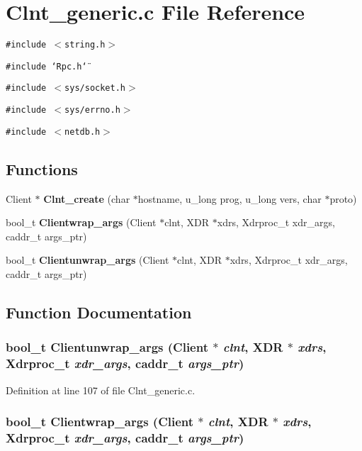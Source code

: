 \section{Clnt\_\-generic.c File Reference}
\label{Clnt__generic_8c}
{\tt \#include $<$string.h$>$}\par
{\tt \#include \char`\"{}Rpc.h\char`\"{}}\par
{\tt \#include $<$sys/socket.h$>$}\par
{\tt \#include $<$sys/errno.h$>$}\par
{\tt \#include $<$netdb.h$>$}\par
\subsection*{Functions}
\begin{CompactItemize}
\item 
Client $\ast$ {\bf Clnt\_\-create} (char $\ast$hostname, u\_\-long prog, u\_\-long vers, char $\ast$proto)
\item 
bool\_\-t {\bf Clientwrap\_\-args} (Client $\ast$clnt, XDR $\ast$xdrs, Xdrproc\_\-t xdr\_\-args, caddr\_\-t args\_\-ptr)
\item 
bool\_\-t {\bf Clientunwrap\_\-args} (Client $\ast$clnt, XDR $\ast$xdrs, Xdrproc\_\-t xdr\_\-args, caddr\_\-t args\_\-ptr)
\end{CompactItemize}


\subsection{Function Documentation}
\subsubsection{\setlength{\rightskip}{0pt plus 5cm}bool\_\-t Clientunwrap\_\-args (Client $\ast$ {\em clnt}, XDR $\ast$ {\em xdrs}, Xdrproc\_\-t {\em xdr\_\-args}, caddr\_\-t {\em args\_\-ptr})}\label{Clnt__generic_8c_a2}




Definition at line 107 of file Clnt\_\-generic.c.
\subsubsection{\setlength{\rightskip}{0pt plus 5cm}bool\_\-t Clientwrap\_\-args (Client $\ast$ {\em clnt}, XDR $\ast$ {\em xdrs}, Xdrproc\_\-t {\em xdr\_\-args}, caddr\_\-t {\em args\_\-ptr})}\label{Clnt__generic_8c_a1}




